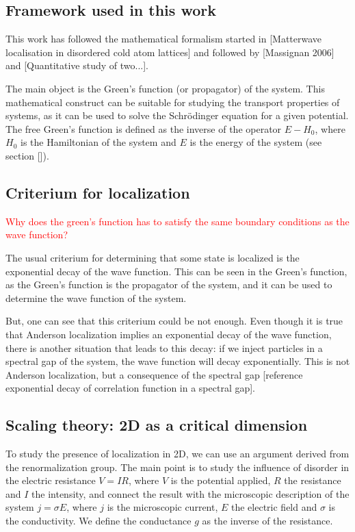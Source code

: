 

\subsection{Framework used in this work}

This work has followed the mathematical formalism started in [Matterwave localisation in disordered cold atom lattices] and followed by [Massignan 2006] and [Quantitative study of two...]. 

The main object is the Green's function (or propagator) of the system. This mathematical construct can be suitable for studying the transport properties of systems, as it can be used to solve the Schrödinger equation for a given potential. The free Green's function is defined as the inverse of the operator $E-H_0$, where $H_0$ is the Hamiltonian of the system and $E$ is the energy of the system (see section []). 

\subsection{Criterium for localization}

\textcolor{red}{Why does the green's function has to satisfy the same boundary conditions as the wave function?}

The usual criterium for determining that some state is localized is the exponential decay of the wave function. This can be seen in the Green's function, as the Green's function is the propagator of the system, and it can be used to determine the wave function of the system.

But, one can see that this criterium could be not enough. Even though it is true that Anderson localization implies an exponential decay of the wave function, there is another situation that leads to this decay: if we inject particles in a spectral gap of the system, the wave function will decay exponentially. This is not Anderson localization, but a consequence of the spectral gap [reference exponential decay of correlation function in a spectral gap].

\subsection{Scaling theory: 2D as a critical dimension}

To study the presence of localization in 2D, we can use an argument derived from the renormalization group. The main point is to study the influence of disorder in the electric resistance $V=IR$, where $V$ is the potential applied, $R$ the resistance and $I$ the intensity, and connect the result with the microscopic description of the system $j=\sigma E$, where $j$ is the microscopic current, $E$ the electric field and $\sigma$ is the conductivity. We define the conductance $g$ as the inverse of the resistance. 

